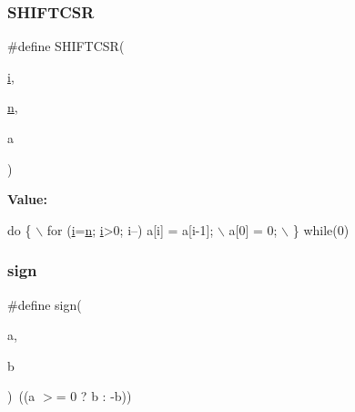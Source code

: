 \subsubsection{\texorpdfstring{S\+H\+I\+F\+T\+C\+SR}{SHIFTCSR}}
{\footnotesize\ttfamily \#define S\+H\+I\+F\+T\+C\+SR(\begin{DoxyParamCaption}\item[{}]{\hyperlink{a00608_afb6aca53df96564f2adf086c942453ec}{i},  }\item[{}]{\hyperlink{a00623_a781a04ab095280f838ff3eb0e51312e0}{n},  }\item[{}]{a }\end{DoxyParamCaption})}

{\bfseries Value\+:}
\begin{DoxyCode}
\textcolor{keywordflow}{do} \{ \(\backslash\)
     for (\hyperlink{a01014_afb6aca53df96564f2adf086c942453ec}{i}=\hyperlink{a00563_a4c2d80ab32fc3a598413ae25e9f2bdce}{n}; \hyperlink{a01014_afb6aca53df96564f2adf086c942453ec}{i}>0; i--) a[i] = a[i-1]; \(\backslash\)
     a[0] = 0; \(\backslash\)
   \} \textcolor{keywordflow}{while}(0)
\end{DoxyCode}
\mbox{\label{a00053_a4ddfa141f8142902738a2e1683a95a71}} 
\subsubsection{\texorpdfstring{sign}{sign}}
{\footnotesize\ttfamily \#define sign(\begin{DoxyParamCaption}\item[{}]{a,  }\item[{}]{b }\end{DoxyParamCaption})~((a $>$= 0 ? b \+: -\/b))}

